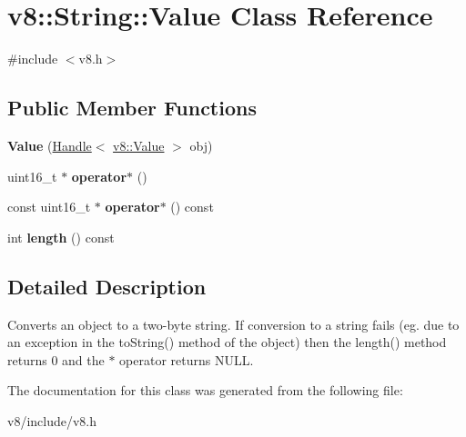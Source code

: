 \hypertarget{classv8_1_1String_1_1Value}{}\section{v8\+:\+:String\+:\+:Value Class Reference}
\label{classv8_1_1String_1_1Value}


{\ttfamily \#include $<$v8.\+h$>$}

\subsection*{Public Member Functions}
\begin{DoxyCompactItemize}
\item 
\hypertarget{classv8_1_1String_1_1Value_a9d6a6d258196a0a34ac257b2abaf659a}{}{\bfseries Value} (\hyperlink{classv8_1_1Handle}{Handle}$<$ \hyperlink{classv8_1_1Value}{v8\+::\+Value} $>$ obj)\label{classv8_1_1String_1_1Value_a9d6a6d258196a0a34ac257b2abaf659a}

\item 
\hypertarget{classv8_1_1String_1_1Value_ae4f44b1977968de2e9f2ff703437fde3}{}uint16\+\_\+t $\ast$ {\bfseries operator$\ast$} ()\label{classv8_1_1String_1_1Value_ae4f44b1977968de2e9f2ff703437fde3}

\item 
\hypertarget{classv8_1_1String_1_1Value_a1cf21001f92284f290a6e550d567e757}{}const uint16\+\_\+t $\ast$ {\bfseries operator$\ast$} () const \label{classv8_1_1String_1_1Value_a1cf21001f92284f290a6e550d567e757}

\item 
\hypertarget{classv8_1_1String_1_1Value_a4b5014d7d4d0f60d39f37e421ae2eb91}{}int {\bfseries length} () const \label{classv8_1_1String_1_1Value_a4b5014d7d4d0f60d39f37e421ae2eb91}

\end{DoxyCompactItemize}


\subsection{Detailed Description}
Converts an object to a two-\/byte string. If conversion to a string fails (eg. due to an exception in the to\+String() method of the object) then the length() method returns 0 and the $\ast$ operator returns N\+U\+L\+L. 

The documentation for this class was generated from the following file\+:\begin{DoxyCompactItemize}
\item 
v8/include/v8.\+h\end{DoxyCompactItemize}
